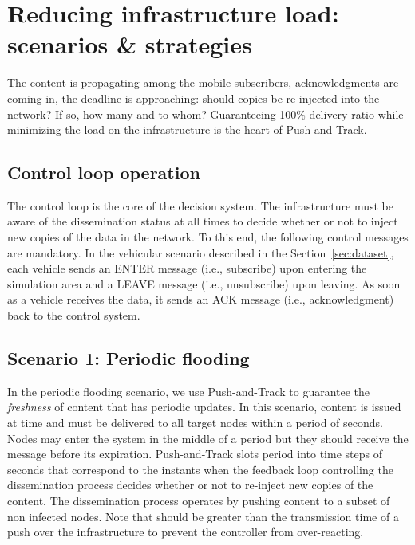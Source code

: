 \documentclass[preprint]{elsarticle}
\begin{document}
\section{Reducing infrastructure load: scenarios \& strategies}
\label{sec:strategies}

The content is propagating among the mobile subscribers, acknowledgments are coming in, the deadline is approaching: should copies be re-injected into the network? If so, how many and to whom? Guaranteeing 100\% delivery ratio while minimizing the load on the infrastructure is the heart of Push-and-Track. 

\subsection{Control loop operation}
\label{subsec:control-loop}

The control loop is the core of the decision system. The infrastructure must be aware of the dissemination status at all times to decide whether or not to inject new copies of the data in the network. To this end, the following control messages are mandatory. In the vehicular scenario described in the Section~\ref{sec:dataset}, each vehicle sends an \textsf{ENTER} message (i.e., subscribe) upon entering the simulation area and a \textsf{LEAVE} message (i.e., unsubscribe) upon leaving. As soon as a vehicle receives the data, it sends an \textsf{ACK} message (i.e., acknowledgment) back to the control system.

\subsection{Scenario 1: Periodic flooding}
\label{subsec:periodic_scenario}

In the periodic flooding scenario, we use Push-and-Track to guarantee the \emph{freshness} of content that has periodic updates. In this scenario, content is issued at time  and must be delivered to all target nodes within a period of  seconds. Nodes may enter the system in the middle of a period but they should receive the message before its expiration. Push-and-Track slots period  into time steps of  seconds that correspond to the instants when the feedback loop controlling the dissemination process decides whether or not to re-inject new copies of the content. The dissemination process operates by pushing content to a subset of non infected nodes. Note that  should be greater than the transmission time of a push over the infrastructure to prevent the controller from over-reacting.
\end{document}
